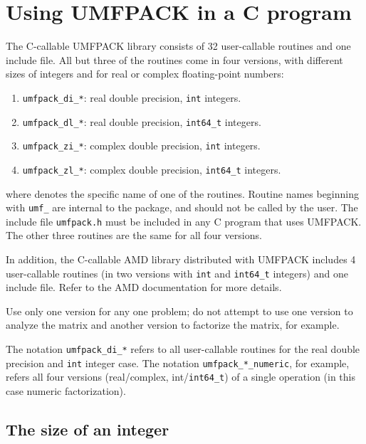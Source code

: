 \documentclass[11pt]{article}
\begin{document}
\section{Using UMFPACK in a C program}
\label{C}

The C-callable UMFPACK library consists of 32 user-callable routines and one
include file.  All but three of the routines come in four versions, with
different sizes of integers and for real or complex floating-point numbers:
\begin{enumerate}
\item {\tt umfpack\_di\_*}: real double precision, {\tt int} integers.
\item {\tt umfpack\_dl\_*}: real double precision, \verb'int64_t' integers.
\item {\tt umfpack\_zi\_*}: complex double precision, {\tt int} integers.
\item {\tt umfpack\_zl\_*}: complex double precision, \verb'int64_t' integers.
\end{enumerate}
where {\tt *} denotes the specific name of one of the routines.
Routine names beginning with {\tt umf\_} are internal to the package,
and should not be called by the user.  The include file {\tt umfpack.h}
must be included in any C program that uses UMFPACK.
The other three routines are the same for all four versions.

In addition, the C-callable AMD library distributed with UMFPACK
includes 4 user-callable routines (in two versions with {\tt int} and
\verb'int64_t' integers) and one include file.  Refer to the AMD documentation
for more details.

Use only one version for any one problem; do not attempt to use one version
to analyze the matrix and another version to factorize the matrix, for example.

The notation {\tt umfpack\_di\_*} refers to all user-callable routines
for the real double precision and {\tt int} integer case.  The notation
{\tt umfpack\_*\_numeric}, for example, refers all four versions
(real/complex, int/\verb'int64_t') of a single operation
(in this case numeric factorization).

\subsection{The size of an integer}
\end{document}
